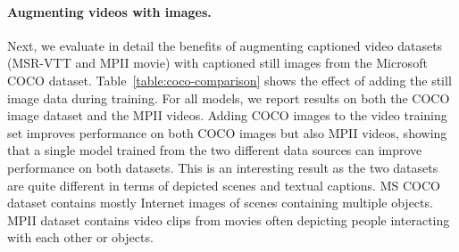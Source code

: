 \documentclass[runningheads]{llncs}
\begin{document}
\begin{table}[t]
  \setlength{\tabcolsep}{3pt}
      \caption{\small The effect of augmenting the MSR-VTT video caption dataset with captioned still images from the MS COCO dataset when relative image to video sampling rate . R@k stands for recall@k, MR stands for Median Rank.}
    \centering
      \label{table:msrvtt-comparison}
\end{table}

\paragraph{Augmenting videos with images.}

Next, we evaluate in detail the benefits of augmenting captioned video datasets (MSR-VTT and MPII movie) with captioned still images from the Microsoft COCO dataset. 
Table~\ref{table:coco-comparison} shows the effect of adding the still image data during training. For all models, we report results on both the COCO image dataset and the MPII videos. Adding COCO images to the video training set improves performance on both COCO images but also MPII videos, showing that a single model trained from the two different data sources can improve performance on both datasets.
This is an interesting result as the two datasets are quite different in terms of depicted scenes and textual captions.
MS COCO dataset contains mostly Internet images of scenes containing multiple objects. MPII dataset contains video clips from movies often depicting people interacting with each other or objects.
\end{document}
